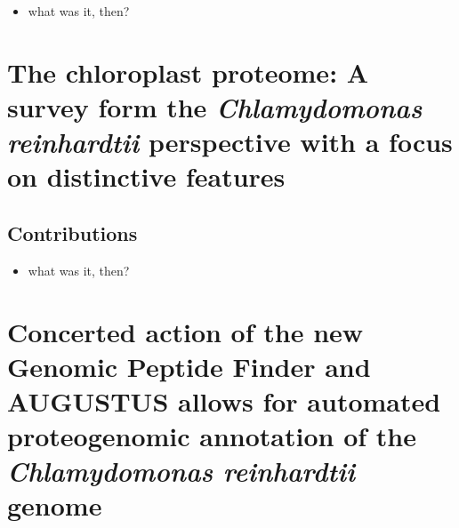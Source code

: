 \begin{itemize}
\item what was it, then?
\end{itemize}


\cleardoublepage
\section{The chloroplast proteome: A survey form the {\em Chlamydomonas reinhardtii} perspective with a focus on distinctive features}

\subsection*{Contributions}

\begin{itemize}
\item what was it, then?
\end{itemize}


\cleardoublepage
\section{Concerted action of the new Genomic Peptide Finder and AUGUSTUS allows for automated proteogenomic annotation of the {\em Chlamydomonas reinhardtii} genome}

